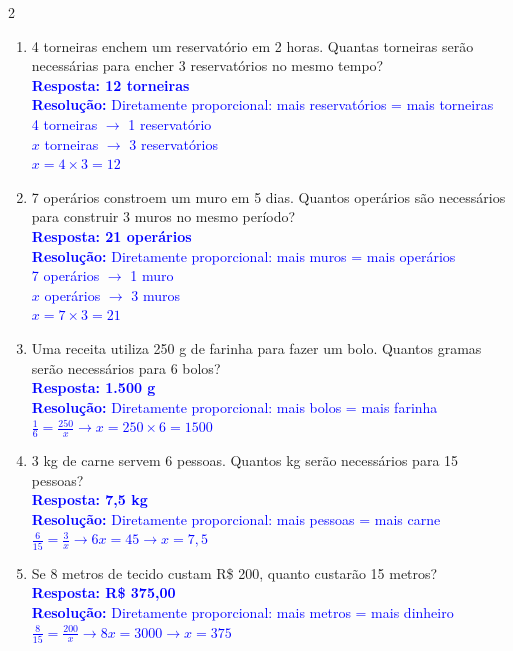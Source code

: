 \documentclass[11pt]{article}
\begin{document}
\begin{multicols}{2}
\begin{enumerate}[leftmargin=*, itemsep=2pt]
\item 4 torneiras enchem um reservatório em 2 horas. Quantas torneiras serão necessárias para encher 3 reservatórios no mesmo tempo? \\
\textcolor{blue}{\textbf{Resposta: 12 torneiras}} \\
\textcolor{blue}{\textbf{Resolução:} Diretamente proporcional: mais reservatórios = mais torneiras} \\
\textcolor{blue}{4 torneiras $\rightarrow$ 1 reservatório} \\
\textcolor{blue}{$x$ torneiras $\rightarrow$ 3 reservatórios} \\
\textcolor{blue}{$x = 4 \times 3 = 12$}

\item 7 operários constroem um muro em 5 dias. Quantos operários são necessários para construir 3 muros no mesmo período? \\
\textcolor{blue}{\textbf{Resposta: 21 operários}} \\
\textcolor{blue}{\textbf{Resolução:} Diretamente proporcional: mais muros = mais operários} \\
\textcolor{blue}{7 operários $\rightarrow$ 1 muro} \\
\textcolor{blue}{$x$ operários $\rightarrow$ 3 muros} \\
\textcolor{blue}{$x = 7 \times 3 = 21$}

\item Uma receita utiliza 250 g de farinha para fazer um bolo. Quantos gramas serão necessários para 6 bolos? \\
\textcolor{blue}{\textbf{Resposta: 1.500 g}} \\
\textcolor{blue}{\textbf{Resolução:} Diretamente proporcional: mais bolos = mais farinha} \\
\textcolor{blue}{$\frac{1}{6} = \frac{250}{x} \rightarrow x = 250 \times 6 = 1500$}

\item 3 kg de carne servem 6 pessoas. Quantos kg serão necessários para 15 pessoas? \\
\textcolor{blue}{\textbf{Resposta: 7,5 kg}} \\
\textcolor{blue}{\textbf{Resolução:} Diretamente proporcional: mais pessoas = mais carne} \\
\textcolor{blue}{$\frac{6}{15} = \frac{3}{x} \rightarrow 6x = 45 \rightarrow x = 7,5$}

\item Se 8 metros de tecido custam R\$ 200, quanto custarão 15 metros? \\
\textcolor{blue}{\textbf{Resposta: R\$ 375,00}} \\
\textcolor{blue}{\textbf{Resolução:} Diretamente proporcional: mais metros = mais dinheiro} \\
\textcolor{blue}{$\frac{8}{15} = \frac{200}{x} \rightarrow 8x = 3000 \rightarrow x = 375$}


\end{enumerate}
\end{multicols}
\end{document}
